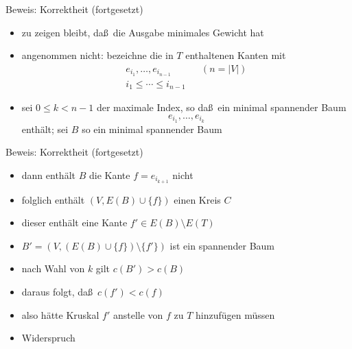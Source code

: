 \documentclass[aspectratio=1610, 11pt]{beamer}
\begin{document}
\begin{frame}
\begin{overprint}
\begin{exampleblock}{Beweis: Korrektheit (fortgesetzt)}
\begin{itemize}
				\item zu zeigen bleibt, da\ss\ die Ausgabe minimales Gewicht hat
				\item angenommen nicht: bezeichne die in $T$ enthaltenen Kanten mit
					\begin{align*}
						e_{i_1},\ldots,e_{i_{n-1}}&&(n=|V|)\\
						i_1\leq\cdots\leq i_{n-1}
					\end{align*}
				\item sei $0\leq k<n-1$ der maximale Index, so da\ss\ ein minimal spannender Baum $$e_{i_1},\ldots,e_{i_k}$$ enth\"alt; sei $B$ so ein minimal spannender Baum
			\end{itemize}
		\end{exampleblock}
		\begin{exampleblock}{Beweis: Korrektheit (fortgesetzt)}
			\begin{itemize}
				\item dann enth\"alt $B$ die Kante $f=e_{i_{k+1}}$ nicht
				\item folglich enth\"alt $(V,E(B)\cup\{f\})$ einen Kreis $C$
				\item dieser enth\"alt eine Kante $f'\in E(B)\setminus E(T)$
				\item $B'=(V,(E(B)\cup\{f\})\setminus\{f'\})$ ist ein spannender Baum
				\item nach Wahl von $k$ gilt $c(B')>c(B)$
				\item daraus folgt, da\ss\ $c(f')<c(f)$
				\item also h\"atte Kruskal $f'$ anstelle von $f$ zu $T$ hinzuf\"ugen m\"ussen
				\item Widerspruch
			\end{itemize}
		\end{exampleblock}
	\end{overprint}
\end{frame}
\end{document}
